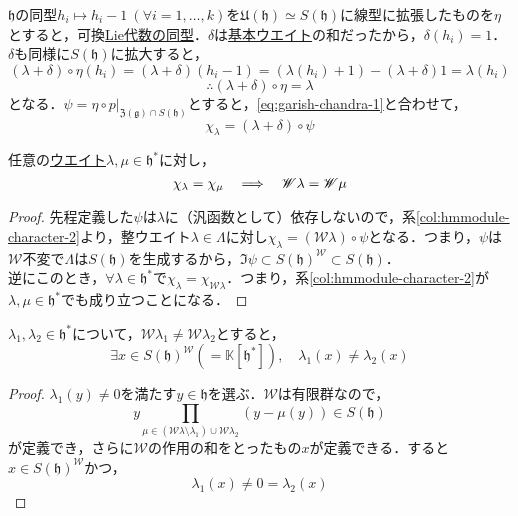 \documentclass[rep_main]{subfiles}
\begin{document}
$\mathfrak{h}$の同型$h_i \mapsto h_i - 1\ (\forall i = 1, \ldots ,k)$を$\mathfrak{U}(\mathfrak{h}) \simeq S(\mathfrak{h})$に線型に拡張したものを$\eta$とすると，可換\hyperref[g-module-hom]{Lie代数の同型}．$\delta$は\hyperref[def:fundamental-weight]{基本ウエイト}の和だったから，$\delta(h_i) = 1$．$\delta$も同様に$S(\mathfrak{h})$に拡大すると，
\begin{equation}
	(\lambda + \delta) \circ \eta(h_i) = (\lambda + \delta)(h_i - 1) = (\lambda(h_i) + 1) - (\lambda + \delta)1 = \lambda(h_i)
\end{equation}
\begin{equation}
	\therefore (\lambda + \delta) \circ \eta = \lambda
\end{equation}
となる．$\psi = \eta \circ p|_{\mathfrak{Z}(\mathfrak{g}) \cap S(\mathfrak{h})}$とすると，\eqref{eq:garish-chandra-1}と合わせて，
\begin{equation}
	\chi_\lambda = (\lambda + \delta) \circ \psi
\end{equation}
\begin{mylem}[label=lem:Harish-Chandra-1]{}
	任意の\hyperref[def:weight-rep]{ウエイト}$\lambda, \mu \in \mathfrak{h}^*$に対し，
	\begin{equation}
		\chi_\lambda = \chi_\mu  \quad \Longrightarrow \quad  \mathscr{W} \lambda = \mathscr{W} \mu
	\end{equation}
\end{mylem}
\begin{proof}
	先程定義した$\psi$は$\lambda$に（汎函数として）依存しないので，系\ref{col:hmmodule-character-2}より，整ウエイト$\lambda \in \Lambda$に対し$\chi_\lambda = (\mathscr{W}\lambda) \circ \psi$となる．つまり，$\psi$は$\mathscr{W}$不変で$\Lambda$は$S(\mathfrak{h})$を生成するから，$\Im\psi \subset S(\mathfrak{h})^\mathscr{W} \subset S(\mathfrak{h})$．\\
	逆にこのとき，$\forall \lambda \in \mathfrak{h}^*$で$\chi_\lambda = \chi_{\mathscr{W}\lambda}$．つまり，系\ref{col:hmmodule-character-2}が$\lambda, \mu \in \mathfrak{h}^*$でも成り立つことになる．
\end{proof}
\begin{mylem}[label=lem:Harish-Chandra-2]{}
	$\lambda_1, \lambda_2 \in \mathfrak{h}^*$について，$\mathscr{W}\lambda_1 \neq \mathscr{W}\lambda_2$とすると，
	\begin{equation}
		\exists x \in S(\mathfrak{h})^\mathscr{W} (= \mathbb{K}[\mathfrak{h}^*]),\quad  \lambda_1(x) \neq \lambda_2(x)
	\end{equation}
\end{mylem}
\begin{proof}
	$\lambda_1(y) \neq 0$を満たす$y \in \mathfrak{h}$を選ぶ．$\mathscr{W}$は有限群なので，
	\begin{equation}
		y\prod_{\mu \in (\mathscr{W}\lambda \setminus \lambda_1) \cup \mathscr{W}\lambda_2} (y - \mu(y)) \in S(\mathfrak{h})
	\end{equation}
	が定義でき，さらに$\mathscr{W}$の作用の和をとったもの$x$が定義できる．すると$x \in S(\mathfrak{h})^\mathscr{W}$かつ，
	\begin{equation}
		\lambda_1(x) \neq 0 = \lambda_2(x) 
	\end{equation}
\end{proof}
\end{document}
